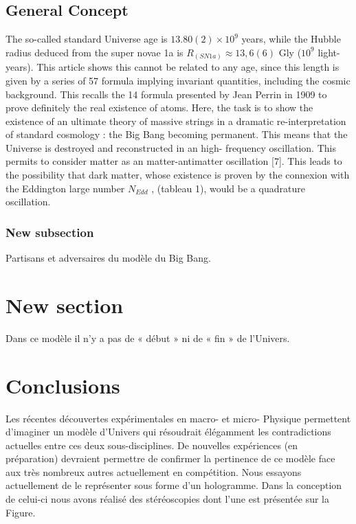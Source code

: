 \documentclass[a4paper,9pt]{article}
\begin{document}
\subsection{General Concept}
The so-called standard Universe age is $13.80(2) \times 10^9$ years, while the Hubble radius deduced
from the super novae 1a is $R_{(SN1a)} \approx 13,6(6)$ Gly ($10^9$ light-years). This article shows this cannot be
related to any age, since this length is given by a series of 57 formula implying invariant quantities,
including the cosmic background. This recalls the 14 formula presented by Jean Perrin in 1909 to
prove definitely the real existence of atoms. Here, the task is to show the existence of an ultimate
theory of massive strings in a dramatic re-interpretation of standard cosmology : the Big Bang
becoming permanent. This means that the Universe is destroyed and reconstructed in an high-
frequency oscillation. This permits to consider matter as an matter-antimatter oscillation [7]. This
leads to the possibility that dark matter, whose existence is proven by the connexion with the
Eddington large number $N_{Edd}$ , (tableau 1), would be a quadrature oscillation.

\subsubsection{New subsection}

Partisans et adversaires du modèle du Big Bang.

\section{New section}
\label{sec:headings}

Dans ce modèle il n'y a pas de « début » ni de « fin » de l'Univers.


\section{Conclusions}
\label{sec:headings}

Les récentes découvertes expérimentales en macro- et micro- Physique permettent d'imaginer un modèle d'Univers qui résoudrait élégamment les contradictions actuelles entre ces deux sous-disciplines. De nouvelles expériences (en préparation) devraient permettre de confirmer la pertinence de ce modèle face aux très nombreux autres actuellement en compétition. Nous essayons actuellement de le représenter sous forme d'un hologramme. Dans la conception de celui-ci nous avons réalisé des stéréoscopies dont l'une est présentée sur la Figure.
\end{document}

